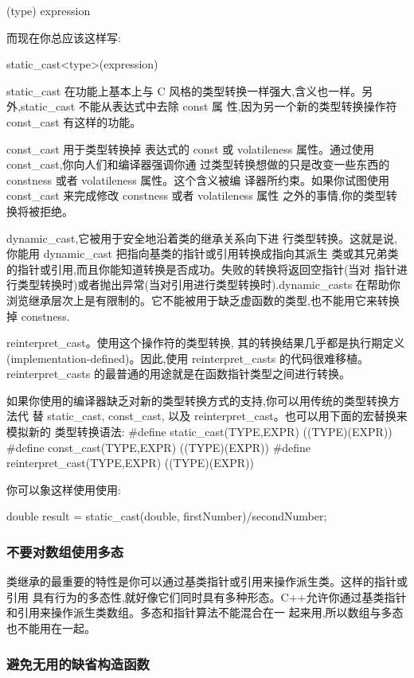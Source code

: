 (type) expression 

而现在你总应该这样写: 

static_cast<type>(expression)

static_cast 在功能上基本上与 C 风格的类型转换一样强大,含义也一样。另外,static_cast 不能从表达式中去除 const 属 性,因为另一个新的类型转换操作符 const_cast 有这样的功能。

const_cast 用于类型转换掉 表达式的 const 或 volatileness 属性。通过使用 const_cast,你向人们和编译器强调你通 过类型转换想做的只是改变一些东西的 constness 或者 volatileness 属性。这个含义被编 译器所约束。如果你试图使用 const_cast 来完成修改 constness 或者 volatileness 属性 之外的事情,你的类型转换将被拒绝。

dynamic_cast,它被用于安全地沿着类的继承关系向下进 行类型转换。这就是说,你能用 dynamic_cast 把指向基类的指针或引用转换成指向其派生 类或其兄弟类的指针或引用,而且你能知道转换是否成功。失败的转换将返回空指针(当对 指针进行类型转换时)或者抛出异常(当对引用进行类型转换时).dynamic_casts 在帮助你浏览继承层次上是有限制的。它不能被用于缺乏虚函数的类型,也不能用它来转换掉 constness.

reinterpret_cast。使用这个操作符的类型转换, 其的转换结果几乎都是执行期定义(implementation-defined)。因此,使用 reinterpret_casts 的代码很难移植。
reinterpret_casts 的最普通的用途就是在函数指针类型之间进行转换。

如果你使用的编译器缺乏对新的类型转换方式的支持,你可以用传统的类型转换方法代 替 static_cast, const_cast, 以及 reinterpret_cast。也可以用下面的宏替换来模拟新的 类型转换语法:
\#define static_cast(TYPE,EXPR) ((TYPE)(EXPR)) 
\#define const_cast(TYPE,EXPR) ((TYPE)(EXPR)) 
\#define reinterpret_cast(TYPE,EXPR) ((TYPE)(EXPR)) 

你可以象这样使用使用:

double result = static_cast(double, firstNumber)/secondNumber;

\subsubsection{不要对数组使用多态}
类继承的最重要的特性是你可以通过基类指针或引用来操作派生类。这样的指针或引用 具有行为的多态性,就好像它们同时具有多种形态。C++允许你通过基类指针和引用来操作派生类数组。多态和指针算法不能混合在一 起来用,所以数组与多态也不能用在一起。

\subsubsection{避免无用的缺省构造函数}
